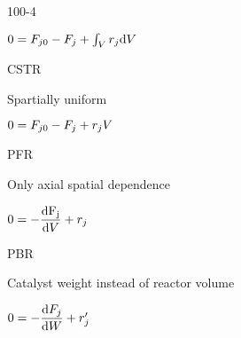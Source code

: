 \begin{mitframe}{100-4}
 \begin{listone}
	\item $0=\force_{j\init}-\force_j+\int_{\vol}\pos_j\mathrm{d}\vol$
    	\begin{listtwo}
        	\item CSTR
            	\begin{listthree}
                	\item Spartially uniform
                    \item $0=\force_{j\init}-\force_j+\pos_j\vol$
                \end{listthree}
        	\item PFR
            	\begin{listfour}
                	\item Only axial spatial dependence
                    \item $0=-\dfrac{\mathrm{d\force_j}}{\mathrm{d}\vol}+\pos_j$
                    \item PBR
                    	\begin{listfive}
                        		\item Catalyst weight instead of reactor volume
                                \item $0=-\dfrac{\mathrm{d}\force_j}{\mathrm{d}\work}+\pos_j'$
                                 \end{listfive}
                \end{listfour}
        \end{listtwo}
\end{listone}   
\end{mitframe}